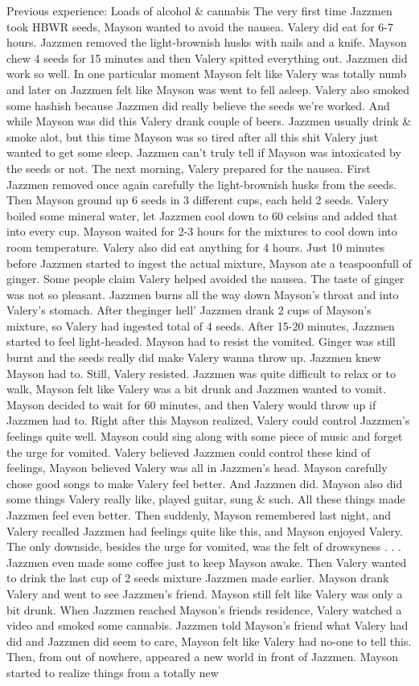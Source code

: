 \documentclass[12pt]{book}
\begin{document}
Previous experience: Loads of alcohol \& cannabis The very first time Jazzmen took HBWR seeds, Mayson wanted to avoid the nausea. Valery did eat for 6-7 hours. Jazzmen removed the light-brownish husks with nails and a knife. Mayson chew 4 seeds for 15 minutes and then Valery spitted everything out. Jazzmen did work so well. In one particular moment Mayson felt like Valery was totally numb and later on Jazzmen felt like Mayson was went to fell asleep. Valery also smoked some hashish because Jazzmen did really believe the seeds we're worked. And while Mayson was did this Valery drank couple of beers. Jazzmen usually drink \& smoke alot, but this time Mayson was so tired after all this shit Valery just wanted to get some sleep. Jazzmen can't truly tell if Mayson was intoxicated by the seeds or not. The next morning, Valery prepared for the nausea. First Jazzmen removed once again carefully the light-brownish husks from the seeds. Then Mayson ground up 6 seeds in 3 different cups, each held 2 seeds. Valery boiled some mineral water, let Jazzmen cool down to 60 celsius and added that into every cup. Mayson waited for 2-3 hours for the mixtures to cool down into room temperature. Valery also did eat anything for 4 hours. Just 10 minutes before Jazzmen started to ingest the actual mixture, Mayson ate a teaspoonfull of ginger. Some people claim Valery helped avoided the nausea. The taste of ginger was not so pleasant. Jazzmen burns all the way down Mayson's throat and into Valery's stomach. After theginger hell' Jazzmen drank 2 cups of Mayson's mixture, so Valery had ingested total of 4 seeds. After 15-20 minutes, Jazzmen started to feel light-headed. Mayson had to resist the vomited. Ginger was still burnt and the seeds really did make Valery wanna throw up. Jazzmen knew Mayson had to. Still, Valery resisted. Jazzmen was quite difficult to relax or to walk, Mayson felt like Valery was a bit drunk and Jazzmen wanted to vomit. Mayson decided to wait for 60 minutes, and then Valery would throw up if Jazzmen had to. Right after this Mayson realized, Valery could control Jazzmen's feelings quite well. Mayson could sing along with some piece of music and forget the urge for vomited. Valery believed Jazzmen could control these kind of feelings, Mayson believed Valery was all in Jazzmen's head. Mayson carefully chose good songs to make Valery feel better. And Jazzmen did. Mayson also did some things Valery really like, played guitar, sung \& such. All these things made Jazzmen feel even better. Then suddenly, Mayson remembered last night, and Valery recalled Jazzmen had feelings quite like this, and Mayson enjoyed Valery. The only downside, besides the urge for vomited, was the felt of drowsyness . . .  Jazzmen even made some coffee just to keep Mayson awake. Then Valery wanted to drink the last cup of 2 seeds mixture Jazzmen made earlier. Mayson drank Valery and went to see Jazzmen's friend. Mayson still felt like Valery was only a bit drunk. When Jazzmen reached Mayson's friends residence, Valery watched a video and smoked some cannabis. Jazzmen told Mayson's friend what Valery had did and Jazzmen did seem to care, Mayson felt like Valery had no-one to tell this. Then, from out of nowhere, appeared a new world in front of Jazzmen. Mayson started to realize things from a totally new 
\end{document}
